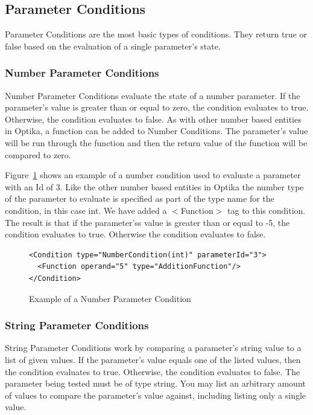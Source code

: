 \subsection{Parameter Conditions}
Parameter Conditions are the most basic types of conditions. They return true or false based on the evaluation of a single parameter's state.

\subsubsection{Number Parameter Conditions}
Number Parameter Conditions evaluate the state of a number parameter. If the parameter's value is greater than or equal to zero, the condition evaluates to true. Otherwise, the 
condition evaluates to false. As with other number based entities in Optika, a function can be added to Number Conditions. The parameter's value will be run through the 
function and then the return value of the function will be compared to zero.

Figure~\ref{simpleNumberCon} shows an example of a number condition used to evaluate a parameter with an Id of 3. Like the other number based entities in Optika the number 
type of the parameter to evaluate is specified as part of the type name for the condition, in this case int. We have added a $<$Function$>$ tag to this condition. The result is 
that if the parameter'ss value is greater than or equal to -5, the condition evaluates to true. Otherwise the condition evaluates to false.
\begin{figure}
\centering
{\footnotesize
\begin{verbatim}
<Condition type="NumberCondition(int)" parameterId="3">
  <Function operand="5" type="AdditionFunction"/>
</Condition>
\end{verbatim}
}
\caption{Example of a Number Parameter Condition}
\label{simpleNumberCon}
\end{figure}

\subsubsection{String Parameter Conditions}
String Parameter Conditions work by comparing a parameter's string value to a list of given values. If the parameter's value equals one of the listed values, then the
condition evaluates to true. Otherwise, the condition evaluates to false. The parameter being tested must be of type string. You may list an arbitrary amount of values to 
compare the parameter's value against, including listing only a single value.

